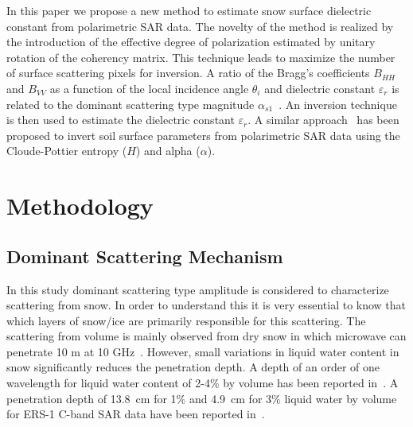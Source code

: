 In this paper we propose a new method to estimate snow surface dielectric constant from polarimetric SAR data. The novelty of the method is realized by the introduction of the effective degree of polarization estimated by unitary rotation of the coherency matrix. This technique leads to maximize the number of surface scattering pixels for inversion.  A ratio of the Bragg's coefficients $B_{HH}$ and $B_{VV}$ as a function of the local incidence angle $\theta_{i}$ and dielectric constant $\varepsilon_{r}$ is related to the dominant scattering type magnitude $\alpha_{s1}$~\cite{TOUZI2007}. An inversion technique is then used to estimate the dielectric constant $\varepsilon_{r}$. A similar approach~\cite{Hajnsek2003} has been proposed to invert soil surface parameters from polarimetric SAR data using the Cloude-Pottier entropy ($H$) and alpha ($\alpha$). 

\section{Methodology}
\subsection{Dominant Scattering Mechanism}
In this study dominant scattering type amplitude is considered to characterize scattering from snow. In order to understand this it is very essential to know that which layers of snow/ice are primarily responsible for this scattering. The scattering from volume is mainly observed from dry snow in which microwave can penetrate 10 m at 10 GHz~\cite{rott1987possibilities}. However, small variations in liquid water content in snow significantly reduces the penetration depth. A depth of an order of one wavelength for liquid water content of 2-4$\%$ by volume has been reported in~\cite{rott1987possibilities}. A penetration depth of 13.8~cm for 1$\%$ and 4.9~cm for 3$\%$ liquid water by volume for ERS-1 C-band SAR data have been reported in~\cite{rott1995monitoring}.

